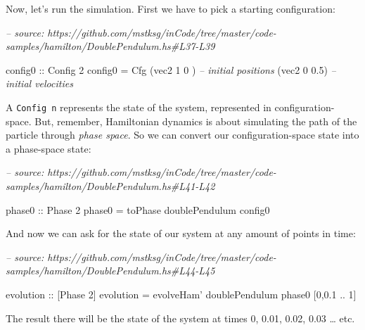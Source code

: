 \documentclass[]{article}
\newenvironment{Shaded}{}{}
\newcommand{\CommentTok}[1]{\textcolor[rgb]{0.38,0.63,0.69}{\textit{#1}}}
\newcommand{\DataTypeTok}[1]{\textcolor[rgb]{0.56,0.13,0.00}{#1}}
\newcommand{\DecValTok}[1]{\textcolor[rgb]{0.25,0.63,0.44}{#1}}
\newcommand{\FloatTok}[1]{\textcolor[rgb]{0.25,0.63,0.44}{#1}}
\newcommand{\FunctionTok}[1]{\textcolor[rgb]{0.02,0.16,0.49}{#1}}
\newcommand{\NormalTok}[1]{#1}
\newcommand{\OtherTok}[1]{\textcolor[rgb]{0.00,0.44,0.13}{#1}}
\begin{document}
Now, let's run the simulation. First we have to pick a starting configuration:

\begin{Shaded}
\begin{Highlighting}[]
\CommentTok{-- source: https://github.com/mstksg/inCode/tree/master/code-samples/hamilton/DoublePendulum.hs#L37-L39}

\OtherTok{config0 ::} \DataTypeTok{Config} \DecValTok{2}
\NormalTok{config0 }\FunctionTok{=} \DataTypeTok{Cfg}\NormalTok{ (vec2 }\DecValTok{1} \DecValTok{0}\NormalTok{  )  }\CommentTok{-- initial positions}
\NormalTok{              (vec2 }\DecValTok{0} \FloatTok{0.5}\NormalTok{)  }\CommentTok{-- initial velocities}
\end{Highlighting}
\end{Shaded}

A \texttt{Config\ n} represents the state of the system, represented in
configuration-space. But, remember, Hamiltonian dynamics is about simulating the
path of the particle through \emph{phase space}. So we can convert our
configuration-space state into a phase-space state:

\begin{Shaded}
\begin{Highlighting}[]
\CommentTok{-- source: https://github.com/mstksg/inCode/tree/master/code-samples/hamilton/DoublePendulum.hs#L41-L42}

\OtherTok{phase0 ::} \DataTypeTok{Phase} \DecValTok{2}
\NormalTok{phase0 }\FunctionTok{=}\NormalTok{ toPhase doublePendulum config0}
\end{Highlighting}
\end{Shaded}

And now we can ask for the state of our system at any amount of points in time:

\begin{Shaded}
\begin{Highlighting}[]
\CommentTok{-- source: https://github.com/mstksg/inCode/tree/master/code-samples/hamilton/DoublePendulum.hs#L44-L45}

\OtherTok{evolution ::}\NormalTok{ [}\DataTypeTok{Phase} \DecValTok{2}\NormalTok{]}
\NormalTok{evolution }\FunctionTok{=}\NormalTok{ evolveHam' doublePendulum phase0 [}\DecValTok{0}\NormalTok{,}\FloatTok{0.1} \FunctionTok{..} \DecValTok{1}\NormalTok{]}
\end{Highlighting}
\end{Shaded}

The result there will be the state of the system at times 0, 0.01, 0.02, 0.03
\ldots{} etc.
\end{document}
